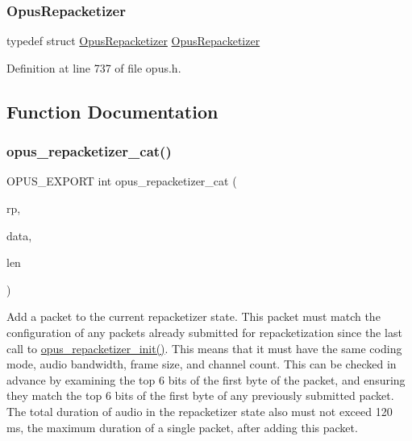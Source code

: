 \subsubsection{\texorpdfstring{OpusRepacketizer}{OpusRepacketizer}}
{\footnotesize\ttfamily typedef struct \mbox{\hyperlink{group__opus__repacketizer_ga1f85070a64bcbf5bf24f5ccb80323e7b}{Opus\+Repacketizer}} \mbox{\hyperlink{group__opus__repacketizer_ga1f85070a64bcbf5bf24f5ccb80323e7b}{Opus\+Repacketizer}}}



Definition at line 737 of file opus.\+h.



\subsection{Function Documentation}
\mbox{\label{group__opus__repacketizer_gaa739f0bbc0ad09ad159ffb6455a6bb55}} 
\subsubsection{\texorpdfstring{opus\_repacketizer\_cat()}{opus\_repacketizer\_cat()}}
{\footnotesize\ttfamily O\+P\+U\+S\+\_\+\+E\+X\+P\+O\+RT int opus\+\_\+repacketizer\+\_\+cat (\begin{DoxyParamCaption}\item[{\mbox{\hyperlink{group__opus__repacketizer_ga1f85070a64bcbf5bf24f5ccb80323e7b}{Opus\+Repacketizer}} $\ast$}]{rp,  }\item[{const unsigned char $\ast$}]{data,  }\item[{\mbox{\hyperlink{opus__types_8h_aa4d309d6f80b99dbabebc8f98879ab9a}{opus\+\_\+int32}}}]{len }\end{DoxyParamCaption})}

Add a packet to the current repacketizer state. This packet must match the configuration of any packets already submitted for repacketization since the last call to \mbox{\hyperlink{group__opus__repacketizer_gadef533688e80dcc96a32b955657aaf28}{opus\+\_\+repacketizer\+\_\+init()}}. This means that it must have the same coding mode, audio bandwidth, frame size, and channel count. This can be checked in advance by examining the top 6 bits of the first byte of the packet, and ensuring they match the top 6 bits of the first byte of any previously submitted packet. The total duration of audio in the repacketizer state also must not exceed 120 ms, the maximum duration of a single packet, after adding this packet.

